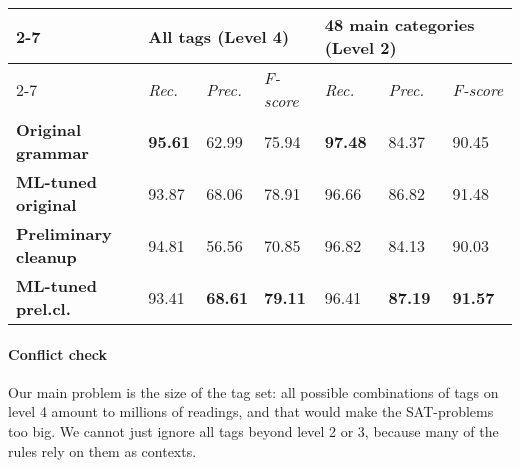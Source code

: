 {{\begin{table*}[t]
\centering
\begin{tabular}{l|l|l|l|l|l|l|}
\cline{2-7}
                                                 & \multicolumn{3}{l|}{\textbf{All tags} (Level 4)}            & \multicolumn{3}{l|}{\textbf{48 main categories} (Level 2)}  \\ \cline{2-7} 
                                                 & \textit{Rec.} & \textit{Prec.} & \textit{F-score} & \textit{Rec.} & \textit{Prec.} & \textit{F-score} \\ \hline
\multicolumn{1}{|l|}{\textbf{Original grammar}}     
					    & \textbf{95.61}  & 62.99         &  75.94         & \textbf{97.48}  &  84.37           &  90.45           \\ \hline
\multicolumn{1}{|l|}{\textbf{ML-tuned original}}    
					    & 93.87          & 68.06             &  78.91              & 96.66          &  86.82           &  91.48            \\ \hline
\multicolumn{1}{|l|}{\textbf{Preliminary cleanup}}  
					   & 94.81           & 56.56             & 70.85               &  96.82         &  84.13           &  90.03           \\ \hline
\multicolumn{1}{|l|}{\textbf{ML-tuned prel.cl.}}      
					   & 93.41           & \textbf{68.61}  & \textbf{79.11}   &  96.41        &  \textbf{87.19}   &  \textbf{91.57}           \\ \hline
\end{tabular}
\caption{Preliminary evaluation on words, excluding punctuation, for levels 4 and 2 of granularity.}
\label{table:res}
\end{table*}

\paragraph{Conflict check}


Our main problem is the size of the tag set: all possible combinations of tags on level 4 amount to millions of readings,
and that would make the SAT-problems too big.
We cannot just ignore all tags beyond level 2 or 3, because many of the rules rely on them as contexts.

}}

